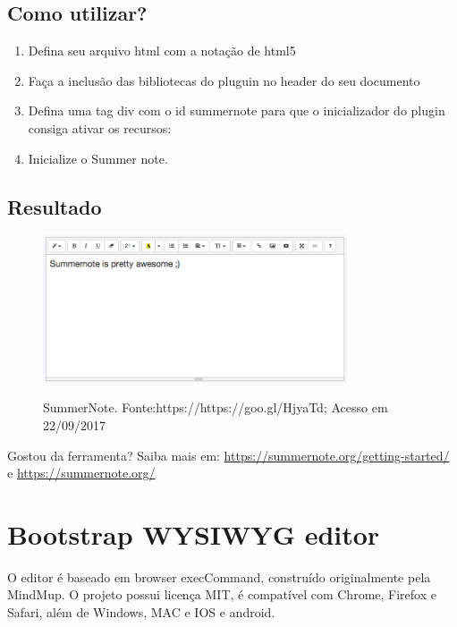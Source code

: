 \documentclass[12pt,a4paper]{article}
\begin{document}
\subsection{Como utilizar?}
\begin{enumerate}
\item Defina seu arquivo html com a notação de html5

\item Faça a inclusão das bibliotecas do pluguin no header do seu documento

\item Defina uma tag div com o id summernote para que o inicializador do plugin consiga ativar os recursos:

\item Inicialize o Summer note.

\end{enumerate}

\subsection{Resultado}

\begin{figure}[h]
\centering
\includegraphics[width=9cm]{recursos/SummerNote/SummerNote.jpg}
\label{3}
\caption{SummerNote. Fonte:https://https://goo.gl/HjyaTd; Acesso em 22/09/2017}
\end{figure}

Gostou da ferramenta? Saiba mais em:
\url{https://summernote.org/getting-started/}
e
\url{https://summernote.org/}



\section{Bootstrap WYSIWYG editor}
O editor é baseado em browser execCommand, construído originalmente pela MindMup. 
O projeto possui licença MIT, é compatível com Chrome, Firefox e Safari, além de Windows, MAC e IOS e android.
\end{document}
